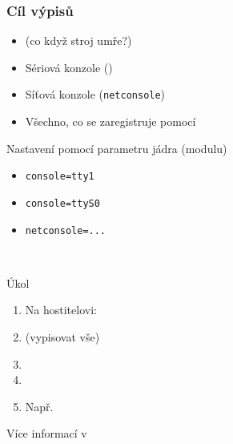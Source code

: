 \begin{frame}
  \frametitle{Cíl výpisů}

  \begin{itemize}
    \item {} (co když stroj umře?)

    \pause

    \item Sériová konzole ()
    \item Síťová konzole (\texttt{netconsole})

    \pause

    \item Všechno, co se zaregistruje pomocí 
  \end{itemize}

  \medskip
  \pause

  Nastavení pomocí parametru jádra (modulu)
  \begin{itemize}
    \item \texttt{console=tty1}
    \item \texttt{console=ttyS0}
    \item \texttt{netconsole=...}
  \end{itemize}

  \medskip
  \pause

  \\

\end{frame}

\begin{frame}{Úkol}

  \begin{enumerate}
    \item Na hostitelovi: 
    \item {} (vypisovat vše)
    \item {}
    \item {}
    \item Např.\ 
  \end{enumerate}

  \smallskip

  Více informací v 

\end{frame}

